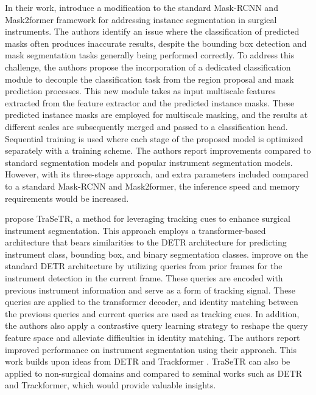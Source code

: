 In their work, \citet{baby2023forks} introduce a modification to the standard Mask-RCNN and Mask2former framework \citep{he2017mask,cheng2022masked} for addressing instance segmentation in surgical instruments. The authors identify an issue where the classification of predicted masks often produces inaccurate results, despite the bounding box detection and mask segmentation tasks generally being performed correctly. To address this challenge, the authors propose the incorporation of a dedicated classification module to decouple the classification task from the region proposal and mask prediction processes. This new module takes as input multiscale features extracted from the feature extractor and the predicted instance masks. These predicted instance masks are employed for multiscale masking, and the results at different scales are subsequently merged and passed to a classification head. Sequential training is used where each stage of the proposed model is optimized separately with a training scheme. The authors report improvements compared to standard segmentation models and popular instrument segmentation models. However, with its three-stage approach, and extra parameters included compared to a standard Mask-RCNN and Mask2former, the inference speed and memory requirements would be increased.


\citet{zhao2022trasetr} propose TraSeTR, a method for leveraging tracking cues to enhance surgical instrument segmentation. This approach employs a transformer-based architecture that bears similarities to the DETR architecture \citep{carion2020end} for predicting instrument class, bounding box, and binary segmentation classes. \citet{zhao2022trasetr} improve on the standard DETR architecture by utilizing queries from prior frames for the instrument detection in the current frame. These queries are encoded with previous instrument information and serve as a form of tracking signal.  
These queries are applied to the transformer decoder, and identity matching between the previous queries and current queries are used as tracking cues. In addition, the authors also apply a contrastive query learning strategy to reshape the query feature space and alleviate difficulties in identity matching. The authors report improved performance on instrument segmentation using their approach. 
 This work builds upon ideas from DETR \cite{carion2020end} and Trackformer \cite{meinhardt2022trackformer}. TraSeTR can also be applied to non-surgical domains and compared to seminal works such as DETR and Trackformer, which would provide valuable insights.


